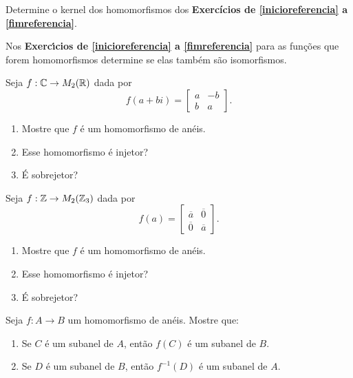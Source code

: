 \documentclass[12pt]{exam}
\begin{document}
\vspace{.3cm}

\questao{} Determine o kernel dos homomorfismos dos \textbf{Exerc{\'i}cios de \ref{inicioreferencia} a \ref{fimreferencia}}.

\vspace{.3cm}

\questao{} Nos \textbf{Exerc{\'\i}cios de \ref{inicioreferencia} a \ref{fimreferencia}} para as fun\c{c}\~oes que forem homomorfismos determine se elas tamb\'em s\~ao isomorfismos.

\vspace{.3cm}

\questao{} Seja $f : \mathbb{C} \to M_2(\mathbb{R})$ dada por
\[
    f(a + bi) = \begin{bmatrix}
        a & -b\\
        b & a
    \end{bmatrix}.
\]
\begin{enumerate}[label=({\alph*})]
    \item Mostre que $f$ \'e um homomorfismo de an\'eis.
    \item Esse homomorfismo \'e injetor?
    \item \'E sobrejetor?
\end{enumerate}

\vspace{.3cm}

\questao{} Seja $f : \mathbb{Z} \to M_2(\mathbb{Z}_3)$ dada por
\[
    f(a) = \begin{bmatrix}
        \overline{a} & \overline{0}\\
        \overline{0} & \overline{a}
    \end{bmatrix}.
\]
\begin{enumerate}[label=({\alph*})]
    \item Mostre que $f$ \'e um homomorfismo de an\'eis.
    \item Esse homomorfismo \'e injetor?
    \item \'E sobrejetor?
\end{enumerate}

\vspace{.3cm}

\questao{} Seja $f: A \to B$ um homomorfismo de an{\'e}is. Mostre que:
\begin{enumerate}[label=({\alph*})]
\item Se $C$  {\'e} um subanel de $A$, ent{\~a}o $f(C)$ {\'e} um subanel de $B$.
\item Se $D$ {\'e} um subanel de $B$, ent{\~a}o $f^{-1}(D)$ {\'e} um subanel de $A$.
\end{enumerate}
\end{document}
